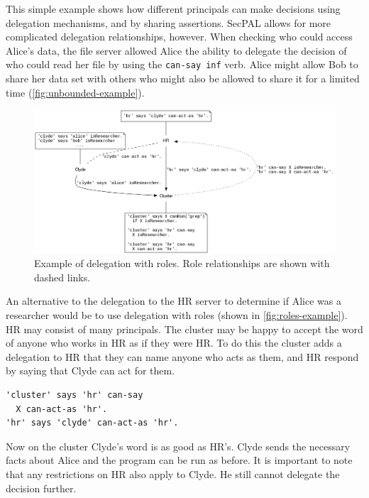 \documentclass[thesis.tex]{subfiles}
\begin{document}
This simple example shows how different principals can make decisions using delegation mechanisms, and by sharing assertions.
SecPAL allows for more complicated delegation relationships, however. When checking who could access Alice's data, the file server allowed Alice the ability to delegate the decision of who could read her file by using the \texttt{can-say inf} verb.
Alice might allow Bob to share her data set with others who might also be allowed to share it for a limited time (\autoref{fig:unbounded-example}).

\begin{figure}
  \centering
  \includegraphics[width=\textwidth]{figures/secpal-example-roles.png}
  \caption[Example of delegation with roles.]{Example of delegation with roles.  Role relationships are shown with dashed links.}
  \label{fig:roles-example}
\end{figure}

An alternative to the delegation to the HR server to determine if
Alice was a researcher would be to use delegation with roles (shown in
\autoref{fig:roles-example}).  HR may consist of many principals.  The
cluster may be happy to accept the word of anyone who works in HR as
if they were HR.  To do this the cluster adds a delegation to HR that
they can name anyone who acts as them, and HR respond by saying that
Clyde can act for them.
\begin{lstlisting}
'cluster' says 'hr' can-say
  X can-act-as 'hr'.
'hr' says 'clyde' can-act-as 'hr'.
\end{lstlisting}
Now on the cluster Clyde's word is as good as HR's.
Clyde sends the necessary facts about Alice and the program can be run as before.
It is important to note that any restrictions on HR also apply to Clyde.  He still cannot delegate the decision further.
\end{document}
